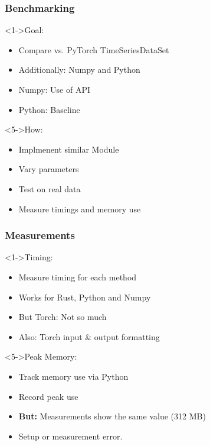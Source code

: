 \documentclass[t,english]{beamer}
\begin{document}

\begin{frame}
    \frametitle{Benchmarking}
    \begin{block}<1->{Goal:}
        \begin{itemize}
        \item<1-> Compare vs. PyTorch TimeSeriesDataSet
        \item<2-> Additionally: Numpy and Python
        \item <3-> Numpy: Use of API
        \item <4-> Python: Baseline
        \end{itemize}
    \end{block}

    \begin{block}<5->{How:}
        \begin{itemize}
        \item<5-> Implmenent similar Module
        \item<6-> Vary parameters
        \item <7-> Test on real data
        \item <8-> Measure timings and memory use
        \end{itemize}
    \end{block}
\end{frame}

\begin{frame}
    \frametitle{Measurements}
    \begin{block}<1->{Timing:}
        \begin{itemize}
        \item<1-> Measure timing for each method
        \item<2-> Works for Rust, Python and Numpy
        \item <3-> But Torch: Not so much
        \item <4-> Also: Torch input \& output formatting
        \end{itemize}
    \end{block}

    \begin{block}<5->{Peak Memory:}
        \begin{itemize}
        \item<5-> Track memory use via Python
        \item <6-> Record peak use
        \item <7-> \textbf{But:} Measurements show the same value (312 MB)
        \item <8-> Setup or measurement error.
        \end{itemize}
    \end{block}
\end{frame}
\end{document}

